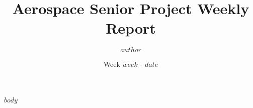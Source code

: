 \documentclass[10pt]{article}
\title{Aerospace Senior Project Weekly Report}
\author{$author$}
\date{Week $week$ - $date$}
\begin{document}
\maketitle

$body$
\end{document}
